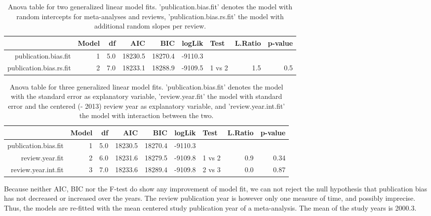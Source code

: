 \documentclass[11pt,a4paper,twoside]{book}\usepackage[]{graphicx}\usepackage[]{color}
\begin{document}
\begin{table}[ht]
\centering
\begingroup\scriptsize
\begin{tabular}{rrrrrrlrr}
  \hline
 & Model & df & AIC & BIC & logLik & Test & L.Ratio & p-value \\ 
  \hline
publication.bias.fit &  1 & 5.0 & 18230.5 & 18270.4 & -9110.3 &  &  &  \\ 
  publication.bias.rs.fit &  2 & 7.0 & 18233.1 & 18288.9 & -9109.5 & 1 vs 2 & 1.5 & 0.5 \\ 
   \hline
\end{tabular}
\endgroup
\caption{Anova table for two generalized linear model fits. 'publication.bias.fit' denotes the model with random intercepts for meta-analyses and reviews, 'publication.bias.rs.fit' the model with additional random slopes per review.} 
\label{anova.random.slopes}
\end{table}





\begin{table}[ht]
\centering
\begingroup\scriptsize
\begin{tabular}{rrrrrrlrr}
  \hline
 & Model & df & AIC & BIC & logLik & Test & L.Ratio & p-value \\ 
  \hline
publication.bias.fit &  1 & 5.0 & 18230.5 & 18270.4 & -9110.3 &  &  &  \\ 
  review.year.fit &  2 & 6.0 & 18231.6 & 18279.5 & -9109.8 & 1 vs 2 & 0.9 & 0.34 \\ 
  review.year.int.fit &  3 & 7.0 & 18233.6 & 18289.4 & -9109.8 & 2 vs 3 & 0.0 & 0.87 \\ 
   \hline
\end{tabular}
\endgroup
\caption{Anova table for three generalized linear model fits. 'publication.bias.fit' denotes the model with the standard error as explanatory variable, 'review.year.fit' the model with standard error and the centered (- 2013) review year as explanatory variable, and 'review.year.int.fit' the model with interaction between the two.} 
\label{anova.lme}
\end{table}


Because neither AIC, BIC nor the F-test do show any improvement of model fit, we can not reject the null hypothesis that publication bias has not decreased or increased over the years. The review publication year is however only one measure of time, and possibly imprecise. Thus, the models are re-fitted with the mean centered study publication year of a meta-analysis. The mean of the study years is 2000.3.
\end{document}
